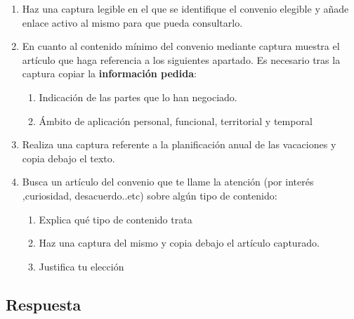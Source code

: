 \begin{enumerate}
    \item Haz una captura legible en el que se identifique el convenio elegible y añade enlace activo al mismo para que pueda consultarlo.
    \item En cuanto al contenido mínimo del convenio mediante captura muestra el artículo que haga referencia a los siguientes apartado. Es necesario tras la captura copiar la \textbf{información pedida}:
    \begin{enumerate}
        \item Indicación de las partes que lo han negociado.
        \item Ámbito de aplicación personal, funcional, territorial y temporal
    \end{enumerate}
    \item Realiza una captura referente a la planificación anual de las vacaciones y copia debajo el texto.
    \item Busca un artículo del convenio que te llame la atención (por interés ,curiosidad, desacuerdo..etc) sobre algún tipo de contenido:
    \begin{enumerate}
        \item Explica qué tipo de contenido trata
        \item Haz una captura del mismo y copia debajo el artículo capturado.
        \item Justifica tu elección
    \end{enumerate}
\end{enumerate}

\subsection{Respuesta}

